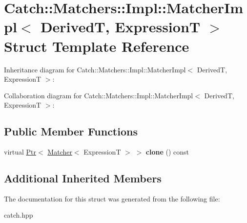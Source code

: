 \hypertarget{struct_catch_1_1_matchers_1_1_impl_1_1_matcher_impl}{}\section{Catch\+:\+:Matchers\+:\+:Impl\+:\+:Matcher\+Impl$<$ DerivedT, ExpressionT $>$ Struct Template Reference}
\label{struct_catch_1_1_matchers_1_1_impl_1_1_matcher_impl}


Inheritance diagram for Catch\+:\+:Matchers\+:\+:Impl\+:\+:Matcher\+Impl$<$ DerivedT, ExpressionT $>$\+:


Collaboration diagram for Catch\+:\+:Matchers\+:\+:Impl\+:\+:Matcher\+Impl$<$ DerivedT, ExpressionT $>$\+:
\subsection*{Public Member Functions}
\begin{DoxyCompactItemize}
\item 
\mbox{\label{struct_catch_1_1_matchers_1_1_impl_1_1_matcher_impl_af7cf4b7b730145d4455dc356490e6b77}} 
virtual \hyperlink{class_catch_1_1_ptr}{Ptr}$<$ \hyperlink{struct_catch_1_1_matchers_1_1_impl_1_1_matcher}{Matcher}$<$ ExpressionT $>$ $>$ {\bfseries clone} () const
\end{DoxyCompactItemize}
\subsection*{Additional Inherited Members}


The documentation for this struct was generated from the following file\+:\begin{DoxyCompactItemize}
\item 
catch.\+hpp\end{DoxyCompactItemize}
